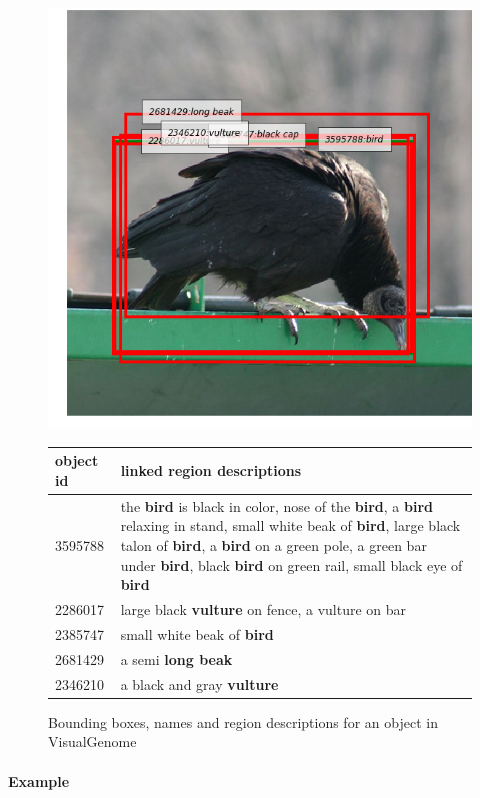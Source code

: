 \documentclass[10pt, a4paper]{article}
\begin{document}
\begin{figure}
\begin{center}
\includegraphics[scale=0.4]{figures/vulture.png} 
\begin{tabular}{lp{6cm}}
object id & linked region descriptions\\
\hline
3595788 & the \textbf{bird} is black in color, nose of the \textbf{bird}, a \textbf{bird} relaxing in stand, small white beak of \textbf{bird}, large black talon of \textbf{bird}, a \textbf{bird} on a green pole, a green bar under \textbf{bird}, black \textbf{bird} on green rail, small black eye of \textbf{bird}\\
2286017 & large black \textbf{vulture} on fence, a vulture on bar\\
2385747 & small white beak of \textbf{bird}\\
2681429 & a semi \textbf{long beak}\\  
2346210 & a black and gray \textbf{vulture}\\
 \end{tabular}
\caption{Bounding boxes, names and region descriptions for an object in VisualGenome}
\label{fig:bird}
\end{center}
\end{figure}

\paragraph{Example}
\end{document}
